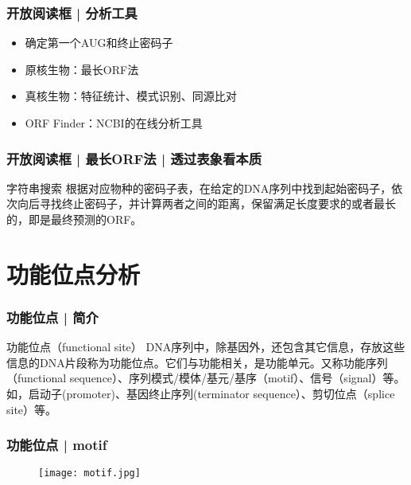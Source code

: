 \begin{frame}
  \frametitle{开放阅读框 | 分析工具}
  \begin{itemize}
    \item 确定第一个AUG和终止密码子
    \item 原核生物：最长ORF法
    \item 真核生物：特征统计、模式识别、同源比对
    \item ORF Finder：NCBI的在线分析工具
  \end{itemize}
\end{frame}

\begin{frame}
  \frametitle{开放阅读框 | 最长ORF法 | 透过表象看本质}
  \begin{block}{字符串搜索}
  根据对应物种的密码子表，在给定的DNA序列中找到起始密码子，依次向后寻找终止密码子，并计算两者之间的距离，保留满足长度要求的或者最长的，即是最终预测的ORF。
  \end{block}
\end{frame}

\section{功能位点分析}
\begin{frame}
  \frametitle{功能位点 | 简介}
  \begin{block}{功能位点（functional site）}
    DNA序列中，除基因外，还包含其它信息，存放这些信息的DNA片段称为功能位点。它们与功能相关，是功能单元。又称功能序列（functional sequence）、序列模式/模体/基元/基序（motif）、信号（signal）等。如，启动子(promoter)、基因终止序列(terminator sequence）、剪切位点（splice site）等。
  \end{block}
\end{frame}

\begin{frame}
  \frametitle{功能位点 | motif}
  \begin{figure}
    \centering
    \texttt{[image: motif.jpg]}
  \end{figure}
\end{frame}


